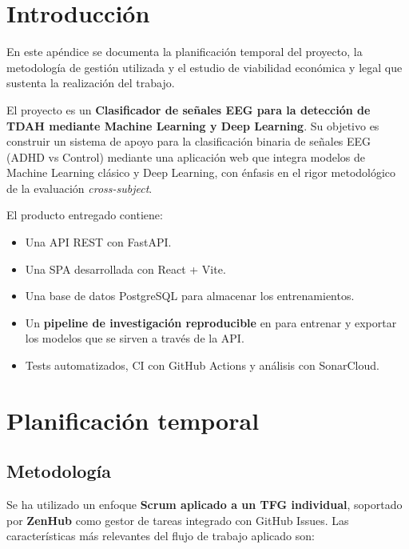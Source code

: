 
\section{Introducción}

En este apéndice se documenta la planificación temporal del proyecto, la metodología de gestión utilizada y el estudio de viabilidad económica y legal que sustenta la realización del trabajo.

El proyecto es un \textbf{Clasificador de señales EEG para la detección de TDAH mediante Machine Learning y Deep Learning}. Su objetivo es construir un sistema de apoyo para la clasificación binaria de señales EEG (ADHD vs Control) mediante una aplicación web que integra modelos de Machine Learning clásico y Deep Learning, con énfasis en el rigor metodológico de la evaluación \emph{cross-subject}.

El producto entregado contiene:

\begin{itemize}
    \item Una API REST con FastAPI.
    \item Una SPA desarrollada con React + Vite.
    \item Una base de datos PostgreSQL para almacenar los entrenamientos.
    \item Un \textbf{pipeline de investigación reproducible} en  para entrenar y exportar los modelos que se sirven a través de la API.
    \item Tests automatizados, CI con GitHub Actions y análisis con SonarCloud.
\end{itemize}

\section{Planificación temporal}

\subsection{Metodología}

Se ha utilizado un enfoque \textbf{Scrum aplicado a un TFG individual}, soportado por \textbf{ZenHub} como gestor de tareas integrado con GitHub Issues. Las características más relevantes del flujo de trabajo aplicado son:

